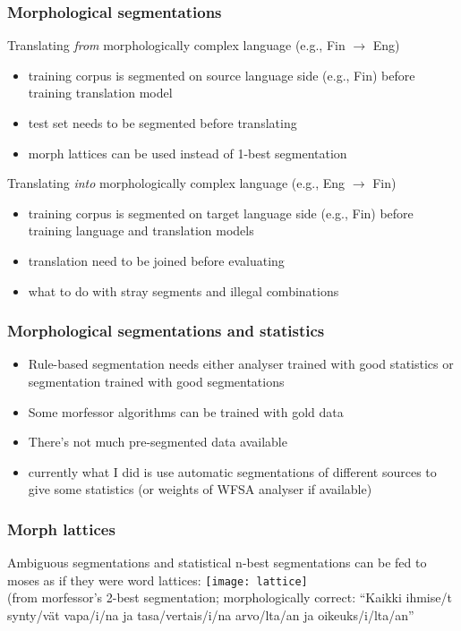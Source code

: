\documentclass{beamer}
\begin{document}
\begin{frame}
    \frametitle{Morphological segmentations}
Translating \emph{from} morphologically complex language (e.g., Fin $\rightarrow$ Eng)
    \begin{itemize}
        \item training corpus is segmented on source language side (e.g., Fin)
            before training translation model
        \item test set needs to be segmented before translating
        \item morph lattices can be used instead of 1-best segmentation
    \end{itemize}
    Translating \emph{into} morphologically complex language (e.g., Eng $\rightarrow$ Fin)
    \begin{itemize}
        \item training corpus is segmented on target language side (e.g., Fin)
            before training language and translation models 
        \item translation need to be joined before evaluating
        \item what to do with stray segments and illegal combinations
    \end{itemize}
\end{frame}

\begin{frame}
    \frametitle{Morphological segmentations and statistics}
    \begin{itemize}
        \item Rule-based segmentation needs either analyser trained with
            good statistics or segmentation trained with good segmentations
        \item Some morfessor algorithms can be trained with gold data
        \item There's not much pre-segmented data available
        \item currently what I did is use automatic segmentations of different
            sources to give some statistics (or weights of WFSA analyser if
            available)
    \end{itemize}
\end{frame}

\begin{frame}
    \frametitle{Morph lattices}
    Ambiguous segmentations and statistical n-best segmentations can be fed to
    moses as if they were word lattices:
    \texttt{[image: lattice]}\\
    (from morfessor's 2-best segmentation; morphologically correct:
    ``Kaikki ihmise/t synty/vät vapa/i/na ja tasa/vertais/i/na arvo/lta/an ja
    oikeuks/i/lta/an''
\end{frame}
\end{document}

